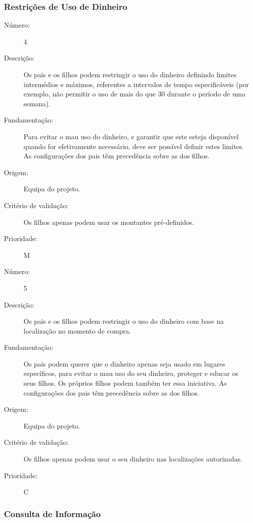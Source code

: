 \documentclass[12pt,a4paper]{article}
\begin{document}
    \subsubsection{Restrições de Uso de Dinheiro}  

      \begin{description}
        \item[Número:]4
        \item[Descrição:]Os pais e os filhos podem restringir o uso do dinheiro definindo limites intermédios e máximos, referentes a intervalos de tempo especificáveis (por exemplo, não permitir o uso de mais do que 30\EUR{} durante o período de uma semana). 
        \item[Fundamentação:]Para evitar o mau uso do dinheiro, e garantir que este esteja disponível quando for efetivamente necessário, deve ser possível definir estes limites. As configurações dos pais têm precedência sobre as dos filhos.
        \item[Origem:]Equipa do projeto.
        \item[Critério de validação:]Os filhos apenas podem usar os montantes pré-definidos.
        \item[Prioridade:]M
      \end{description}
\vspace{0.5cm}
      \begin{description}
        \item[Número:]5
        \item[Descrição:]Os pais e os filhos podem restringir o uso do dinheiro com base na localização no momento de compra.
        \item[Fundamentação:]Os pais podem querer que o dinheiro apenas seja usado em lugares específicos, para evitar o mau uso do seu dinheiro, proteger e educar os seus filhos. Os próprios filhos podem também ter essa iniciativa. As configurações dos pais têm precedência sobre as dos filhos.
        \item[Origem:]Equipa do projeto.
        \item[Critério de validação:]Os filhos apenas podem usar o seu dinheiro nas localizações autorizadas.
        \item[Prioridade:]C
      \end{description}


    \subsubsection{Consulta de Informação}
\end{document}
